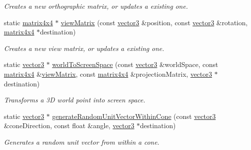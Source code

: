 \begin{DoxyCompactItemize}
\begin{DoxyCompactList}\small\item\em Creates a new orthographic matrix, or updates a existing one. \end{DoxyCompactList}\item 
static \hyperlink{classflounder_1_1matrix4x4}{matrix4x4} $\ast$ \hyperlink{classflounder_1_1matrix4x4_aee10976c10baabe8c69374ab64431cd4}{view\+Matrix} (const \hyperlink{classflounder_1_1vector3}{vector3} \&position, const \hyperlink{classflounder_1_1vector3}{vector3} \&rotation, \hyperlink{classflounder_1_1matrix4x4}{matrix4x4} $\ast$destination)
\begin{DoxyCompactList}\small\item\em Creates a new view matrix, or updates a existing one. \end{DoxyCompactList}\item 
static \hyperlink{classflounder_1_1vector3}{vector3} $\ast$ \hyperlink{classflounder_1_1matrix4x4_a38e620a079b7ce6d5faa4ded52dbd636}{world\+To\+Screen\+Space} (const \hyperlink{classflounder_1_1vector3}{vector3} \&world\+Space, const \hyperlink{classflounder_1_1matrix4x4}{matrix4x4} \&\hyperlink{classflounder_1_1matrix4x4_aee10976c10baabe8c69374ab64431cd4}{view\+Matrix}, const \hyperlink{classflounder_1_1matrix4x4}{matrix4x4} \&projection\+Matrix, \hyperlink{classflounder_1_1vector3}{vector3} $\ast$destination)
\begin{DoxyCompactList}\small\item\em Transforms a 3D world point into screen space. \end{DoxyCompactList}\item 
static \hyperlink{classflounder_1_1vector3}{vector3} $\ast$ \hyperlink{classflounder_1_1matrix4x4_a8edd59480633091d5fa6458bbb853cc9}{generate\+Random\+Unit\+Vector\+Within\+Cone} (const \hyperlink{classflounder_1_1vector3}{vector3} \&cone\+Direction, const float \&angle, \hyperlink{classflounder_1_1vector3}{vector3} $\ast$destination)
\begin{DoxyCompactList}\small\item\em Generates a random unit vector from within a cone. \end{DoxyCompactList}\end{DoxyCompactItemize}
